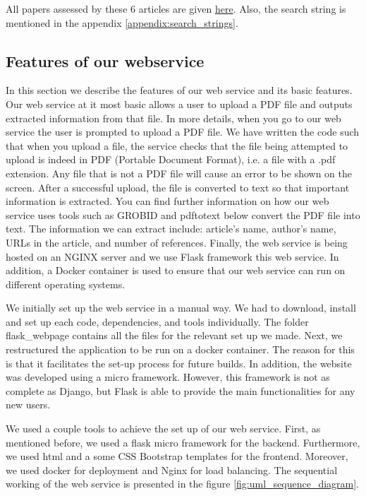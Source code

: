 \documentclass[
10pt, %
a4paper, %
oneside, %
headinclude,footinclude, %
BCOR5mm, %
]{scrartcl}
\begin{document}
All papers assessed by these 6 articles are given
\href{https://www.dropbox.com/home/NordlingLab_Course_ScientificInformation/Team_Freshman/Literature\%20review\%20on\%20assessments\%20of\%20reproducibility}{here}. Also, the search string is mentioned in the appendix \ref{appendix:search_strings}.






\subsection{Features of our webservice}

In this section we describe the features of our web service and its basic features. Our web service at it most basic allows a user to upload a PDF file and outputs extracted information from that file. In more details, when you go to our web service the user is prompted 
to upload a PDF file. We have written the code such that when you upload a file, the service checks that the file being attempted to upload is indeed in PDF (Portable Document Format), i.e. a file with a .pdf extension. Any file that is not a PDF file will cause an error to be shown on the screen. 
After a successful upload, the file is converted to text so that important information is extracted. You can find further information on how our web service uses tools such as GROBID and pdftotext below convert the PDF file into text. 
The information we can extract include: article's name, author's name, URLs in the article, and number of references. Finally, the web service is being hosted on an NGINX server and we use Flask framework this web service. In addition, a Docker container is used to ensure that our web service can run on different operating systems. 



We initially set up the web service in a manual way. We had to download, install and set up each code, dependencies, and tools individually. The folder flask{\_}webpage contains all the files for the relevant set up we made. Next, we restructured the application to be run on a docker container. The reason for this is that it facilitates the set-up process for future builds.
In addition, the website  was developed using a micro framework. However, this framework is not as complete as Django, but Flask is able to provide the main functionalities for any new users. 

We used a couple tools to achieve the set up of our web service. First, as mentioned before, we used a flask micro framework for the backend. Furthermore, we used html and a some CSS Bootstrap templates for the frontend. Moreover, we used docker for deployment and Nginx for load balancing. The sequential working of the web service is presented in the figure \ref{fig:uml_sequence_diagram}.
\end{document}
